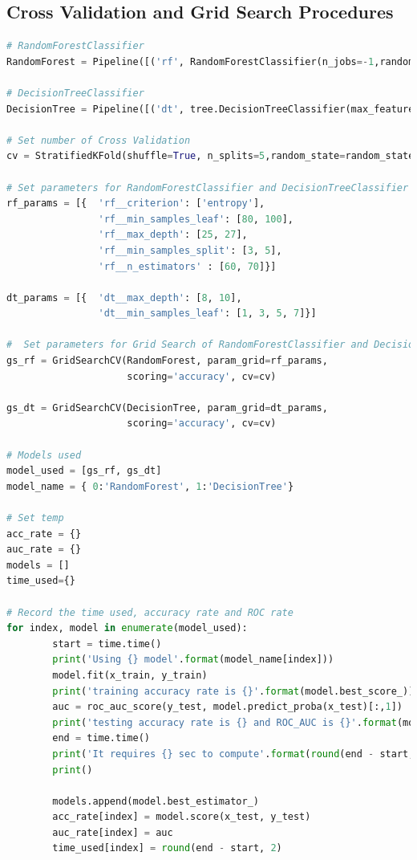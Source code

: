 \documentclass[11pt,a4paper]{article}
\begin{document}
    \subsection{Cross Validation and Grid Search Procedures}
\begin{lstlisting}[language = Python]
# RandomForestClassifier
RandomForest = Pipeline([('rf', RandomForestClassifier(n_jobs=-1,random_state=random_state))])

# DecisionTreeClassifier
DecisionTree = Pipeline([('dt', tree.DecisionTreeClassifier(max_features='auto',random_state=random_state))])

# Set number of Cross Validation
cv = StratifiedKFold(shuffle=True, n_splits=5,random_state=random_state)

# Set parameters for RandomForestClassifier and DecisionTreeClassifier
rf_params = [{  'rf__criterion': ['entropy'],
                'rf__min_samples_leaf': [80, 100],
                'rf__max_depth': [25, 27],
                'rf__min_samples_split': [3, 5],
                'rf__n_estimators' : [60, 70]}]

dt_params = [{  'dt__max_depth': [8, 10],
                'dt__min_samples_leaf': [1, 3, 5, 7]}]

#  Set parameters for Grid Search of RandomForestClassifier and DecisionTreeClassifier
gs_rf = GridSearchCV(RandomForest, param_grid=rf_params,
                     scoring='accuracy', cv=cv)

gs_dt = GridSearchCV(DecisionTree, param_grid=dt_params,
                     scoring='accuracy', cv=cv)

# Models used
model_used = [gs_rf, gs_dt]
model_name = { 0:'RandomForest', 1:'DecisionTree'}

# Set temp
acc_rate = {}
auc_rate = {}
models = []
time_used={}

# Record the time used, accuracy rate and ROC rate
for index, model in enumerate(model_used):
        start = time.time()
        print('Using {} model'.format(model_name[index]))
        model.fit(x_train, y_train)
        print('training accuracy rate is {}'.format(model.best_score_))
        auc = roc_auc_score(y_test, model.predict_proba(x_test)[:,1])
        print('testing accuracy rate is {} and ROC_AUC is {}'.format(model.score(x_test, y_test),auc))
        end = time.time()
        print('It requires {} sec to compute'.format(round(end - start, 2)))
        print()
        
        models.append(model.best_estimator_)
        acc_rate[index] = model.score(x_test, y_test)
        auc_rate[index] = auc
        time_used[index] = round(end - start, 2)
\end{lstlisting}
\end{document}

